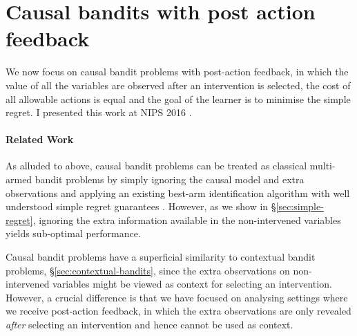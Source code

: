 \documentclass[11pt,a4paper,twoside]{report}
\theoremstyle{plain}
\theoremstyle{definition}
\begin{document}
\section{Causal bandits with post action feedback}
\label{sec:causal-bandit-post-action-feedback}

We now focus on causal bandit problems with post-action feedback, in which the value of all the variables are observed after an intervention is selected, the cost of all allowable actions is equal and the goal of the learner is to minimise the simple regret. I presented this work at NIPS 2016 \citep{NIPS2016_6195}.

\paragraph{Related Work} As alluded to above, causal bandit problems can be treated as classical multi-armed bandit problems by simply ignoring the causal model and extra observations and applying an existing best-arm identification algorithm with well understood simple regret guarantees \citep{Jamieson2013}. However, as we show in \S\ref{sec:simple-regret}, ignoring the extra information available in the non-intervened variables yields sub-optimal performance.

Causal bandit problems have a superficial similarity to contextual bandit problems, \S\ref{sec:contextual-bandits}, since the extra observations on non-intervened variables might be viewed as context for selecting an intervention. 
However, a crucial difference is that we have focused on analysing settings where we receive post-action feedback, in which the extra observations are only revealed \emph{after} selecting an intervention and hence cannot be used as context. 
\end{document}
